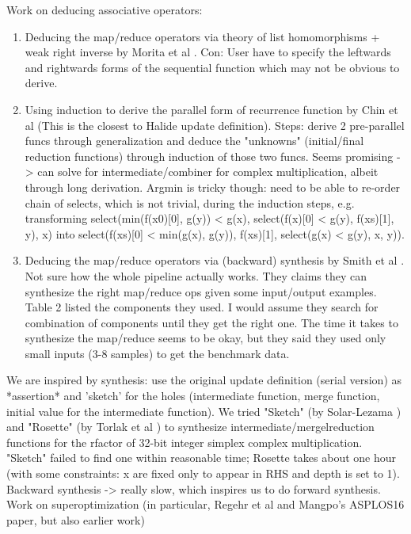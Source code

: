 Work on deducing associative operators: \\
\begin{enumerate}
	\item Deducing the map/reduce operators via theory of list homomorphisms + weak right inverse by Morita et al \cite{Morita:2007:AIG:1250734.1250752}. Con: User have to specify the leftwards and rightwards forms of the sequential function which may not be obvious to derive. 
	\item Using induction to derive the parallel form of recurrence function by Chin et al \cite{Teo:1997:DEP:266670.266697} (This is the closest to Halide update definition). Steps: derive 2 pre-parallel funcs through generalization and deduce the "unknowns" (initial/final reduction functions) through induction of those two funcs. Seems promising -> can solve for intermediate/combiner for complex multiplication, albeit through long derivation. Argmin is tricky though: need to be able to re-order chain of selects, which is not trivial, during the induction steps, e.g. transforming select(min(f(x0)[0], g(y)) < g(x), select(f(x)[0] < g(y), f(xs)[1], y), x) into select(f(xs)[0] < min(g(x), g(y)), f(xs)[1], select(g(x) < g(y), x, y)). 	 
	\item Deducing the map/reduce operators via (backward) synthesis by Smith et al \cite{Smith:2016:MPS:2908080.2908102}. Not sure how the whole pipeline actually works. They claims they can synthesize the right map/reduce ops given some input/output examples. Table 2 listed the components they used. I would assume they search for combination of components until they get the right one. The time it takes to synthesize the map/reduce seems to be okay, but they said they used only small inputs (3-8 samples) to get the benchmark data. \\
\end{enumerate}
	
We are inspired by synthesis: use the original update definition (serial version) as *assertion* and 'sketch' for the holes (intermediate function, merge function, initial value for the intermediate function). We tried "Sketch" (by Solar-Lezama \cite{Solar-Lezama:2008:PSS:1714168}) and "Rosette" (by Torlak et al \cite{Torlak:2013:GSL:2509578.2509586}) to synthesize intermediate/mergelreduction functions for the rfactor of 32-bit integer simplex complex multiplication. "Sketch" failed to find one within reasonable time; Rosette takes about one hour (with some constraints: x are fixed only to appear in RHS and depth is set to 1). Backward synthesis -> really slow, which inspires us to do forward synthesis.\\
	
Work on superoptimization (in particular, Regehr et al and Mangpo's ASPLOS16 paper, but also earlier work)


